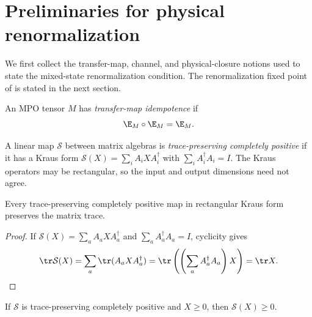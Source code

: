 \section{Preliminaries for physical renormalization}

We first collect the transfer-map, channel, and physical-closure notions used
to state the mixed-state renormalization condition.  The renormalization fixed
point of \cite[Definition~4.1]{Cirac2016MPDO_arXiv} is stated in the next
section.

\begin{definition}\label{def:is_rfp_mpdo}
    \leanok
    An MPO tensor $M$ has \emph{transfer-map idempotence} if
    \[
        \E_M \circ \E_M = \E_M.
    \]
\end{definition}


\begin{definition}
    \label{def:is_kraus_cptp}
    \leanok
    A linear map $\mathcal{S}$ between matrix algebras is \emph{trace-preserving
        completely positive} if it has a Kraus form
    $\mathcal{S}(X) = \sum_{i} A_i X A_i^\dagger$ with $\sum_i A_i^\dagger A_i = I$.
    The Kraus operators may be rectangular, so the input and output dimensions
    need not agree.
\end{definition}

\begin{theorem}
    \label{thm:is_kraus_cptp_trace_map}
    \leanok
    Every trace-preserving completely positive map in rectangular Kraus form
    preserves the matrix trace.
\end{theorem}

\begin{proof}
    \leanok
    If $\mathcal S(X)=\sum_a A_a X A_a^\dagger$ and
    $\sum_a A_a^\dagger A_a=I$, cyclicity gives
    \[
        \tr\mathcal S(X)
        =\sum_a\tr(A_aXA_a^\dagger)
        =\tr\left(\left(\sum_a A_a^\dagger A_a\right)X\right)
        =\tr X.
    \]
\end{proof}

\begin{lemma}
    \label{lem:is_kraus_cptp_map_pos}
    \leanok
    If $\mathcal S$ is trace-preserving completely positive and $X\geq0$, then
    $\mathcal S(X)\geq0$.
\end{lemma}

